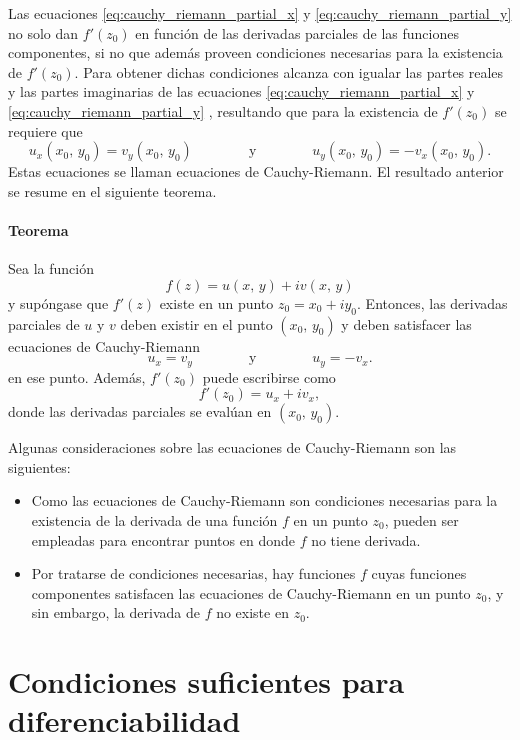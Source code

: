 \documentclass[a4paper]{report}
\begin{document}
Las ecuaciones \ref{eq:cauchy_riemann_partial_x} y \ref{eq:cauchy_riemann_partial_y} no solo dan \(f'(z_0)\) en función de las derivadas parciales de las funciones componentes, si no que además proveen condiciones necesarias para la existencia de \(f'(z_0)\). Para obtener dichas condiciones alcanza con igualar las partes reales y las partes imaginarias de las ecuaciones \ref{eq:cauchy_riemann_partial_x} y \ref{eq:cauchy_riemann_partial_y} , resultando que para la existencia de \(f'(z_0)\) se requiere que 
\begin{equation}\label{eq:cauchy_riemann_equations}
 u_x(x_0,\,y_0)=v_y(x_0,\,y_0)
 \qquad\qquad\textrm{y}\qquad\qquad
 u_y(x_0,\,y_0)=-v_x(x_0,\,y_0).
\end{equation}
Estas ecuaciones se llaman ecuaciones de Cauchy-Riemann. El resultado anterior se resume en el siguiente teorema.

\paragraph{Teorema} Sea la función
\[
 f(z)=u(x,\,y)+iv(x,\,y)
\]
y supóngase que \(f'(z)\) existe en un punto \(z_0=x_0+iy_0\). Entonces, las derivadas parciales de \(u\) y \(v\) deben existir en el punto \((x_0,\,y_0)\) y deben satisfacer las ecuaciones de Cauchy-Riemann
\[
 u_x=v_y
 \qquad\qquad\textrm{y}\qquad\qquad
 u_y=-v_x.
\]
en ese punto. Además, \(f'(z_0)\) puede escribirse como
\[
 f'(z_0)=u_x+iv_x,
\]
donde las derivadas parciales se evalúan en \((x_0,\,y_0)\).

Algunas consideraciones sobre las ecuaciones de Cauchy-Riemann son las siguientes:
\begin{itemize}
 \item Como las ecuaciones de Cauchy-Riemann son condiciones necesarias para la existencia de la derivada de una función \(f\) en un punto \(z_0\), pueden ser empleadas para encontrar puntos en donde \(f\) no tiene derivada.
 \item Por tratarse de condiciones necesarias, hay funciones \(f\) cuyas funciones componentes satisfacen las ecuaciones de Cauchy-Riemann en un punto \(z_0\), y sin embargo, la derivada de \(f\) no existe en \(z_0\).
\end{itemize}

\section{Condiciones suficientes para diferenciabilidad}\label{sec:differentiability_sufficient_conditions}
\end{document}
